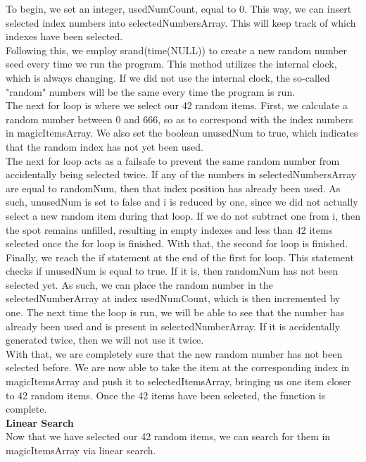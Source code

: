 \documentclass{article}
\begin{document}
To begin, we set an integer, usedNumCount, equal to 0. This way, we can insert selected index numbers into selectedNumbersArray. This will keep track of which indexes have been selected. \\
Following this, we employ srand(time(NULL)) to create a new random number seed every time we run the program. This method utilizes the internal clock, which is always changing. If we did not use the internal clock, the so-called "random" numbers will be the same every time the program is run. \\
The next for loop is where we select our 42 random items. First, we calculate a random number between 0 and 666, so as to correspond with the index numbers in magicItemsArray. We also set the boolean unusedNum to true, which indicates that the random index has not yet been used. \\
The next for loop acts as a failsafe to prevent the same random number from accidentally being selected twice. If any of the numbers in selectedNumbersArray are equal to randomNum, then that index position has already been used. As such, unusedNum is set to false and i is reduced by one, since we did not actually select a new random item during that loop. If we do not subtract one from i, then the spot remains unfilled, resulting in empty indexes and less than 42 items selected once the for loop is finished. With that, the second for loop is finished. \\
Finally, we reach the if statement at the end of the first for loop. This statement checks if unusedNum is equal to true. If it is, then randomNum has not been selected yet. As such, we can place the random number in the selectedNumberArray at index usedNumCount, which is then incremented by one. The next time the loop is run, we will be able to see that the number has already been used and is present in selectedNumberArray. If it is accidentally generated twice, then we will not use it twice. \\
With that, we are completely sure that the new random number has not been selected before. We are now able to take the item at the corresponding index in magicItemsArray and push it to selectedItemsArray, bringing us one item closer to 42 random items. Once the 42 items have been selected, the function is complete. \\

\textbf{Linear Search} \\
Now that we have selected our 42 random items, we can search for them in magicItemsArray via linear search.
\end{document}
